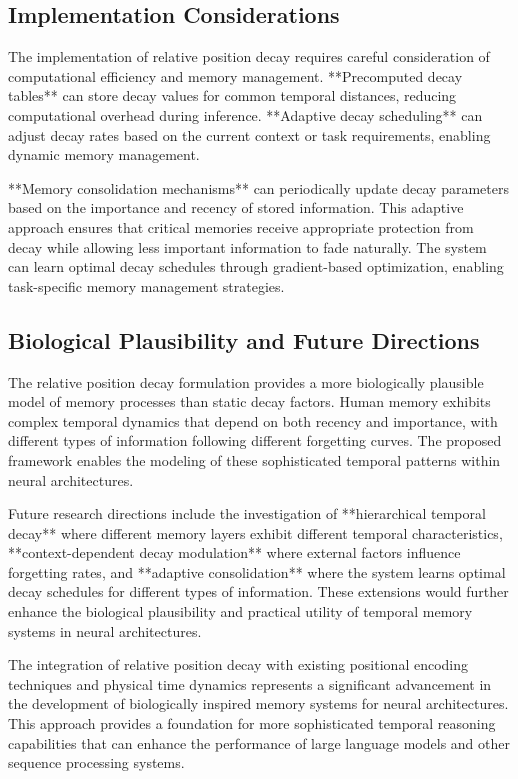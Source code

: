 \documentclass{article}
\begin{document}
\subsection{Implementation Considerations}

The implementation of relative position decay requires careful consideration of computational efficiency and memory management. **Precomputed decay tables** can store decay values for common temporal distances, reducing computational overhead during inference. **Adaptive decay scheduling** can adjust decay rates based on the current context or task requirements, enabling dynamic memory management.

**Memory consolidation mechanisms** can periodically update decay parameters based on the importance and recency of stored information. This adaptive approach ensures that critical memories receive appropriate protection from decay while allowing less important information to fade naturally. The system can learn optimal decay schedules through gradient-based optimization, enabling task-specific memory management strategies.

\subsection{Biological Plausibility and Future Directions}

The relative position decay formulation provides a more biologically plausible model of memory processes than static decay factors. Human memory exhibits complex temporal dynamics that depend on both recency and importance, with different types of information following different forgetting curves. The proposed framework enables the modeling of these sophisticated temporal patterns within neural architectures.

Future research directions include the investigation of **hierarchical temporal decay** where different memory layers exhibit different temporal characteristics, **context-dependent decay modulation** where external factors influence forgetting rates, and **adaptive consolidation** where the system learns optimal decay schedules for different types of information. These extensions would further enhance the biological plausibility and practical utility of temporal memory systems in neural architectures.

The integration of relative position decay with existing positional encoding techniques and physical time dynamics represents a significant advancement in the development of biologically inspired memory systems for neural architectures. This approach provides a foundation for more sophisticated temporal reasoning capabilities that can enhance the performance of large language models and other sequence processing systems.
\end{document}
